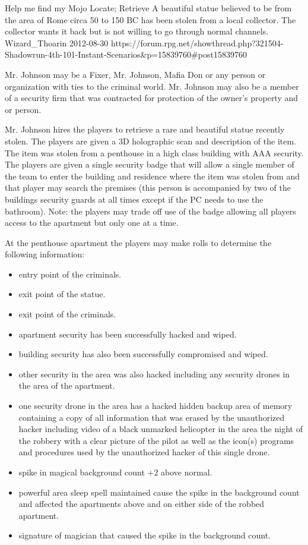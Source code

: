 \begin{scenario}{Help me find my Mojo}
	{Locate; Retrieve}
	{A beautiful statue believed to be from the area of Rome circa 50 to 150 BC has been stolen from a local collector. The collector wants it back but is not willing to go through normal channels.}
	{Wizard\_Thoarin}
	{2012-08-30}
	{https://forum.rpg.net/showthread.php?321504-Shadowrun-4th-101-Instant-Scenarios\&p=15839760#post15839760}

 Mr. Johnson may be a Fixer, Mr. Johnson, Mafia Don or any person or organization with ties to the criminal world. Mr. Johnson may also be a member of a security firm that was contracted for protection of the owner's property and or person.

\synopsis
 Mr. Johnson hires the players to retrieve a rare and beautiful statue recently stolen. The players are given a 3D holographic scan and description of the item. The item was stolen from a penthouse in a high class building with AAA security. The players are given a single security badge that will allow a single member of the team to enter the building and residence where the item was stolen from and that player may search the premises (this person is accompanied by two of the buildings security guards at all times except if the PC needs to use the bathroom). Note: the players may trade off use of the badge allowing all players access to the apartment but only one at a time.

At the penthouse apartment the players may make rolls to determine the following information:

\begin{itemize}
\item    entry point of the criminals.
\item    exit point of the statue.
\item    exit point of the criminals.
\item    apartment security has been successfully hacked and wiped.
\item    building security has also been successfully compromised and wiped.
\item    other security in the area was also hacked including any security drones in the area of the apartment.
\item    one security drone in the area has a hacked hidden backup area of memory containing a copy of all information that was erased by the unauthorized hacker including video of a black unmarked helicopter in the area the night of the robbery with a clear picture of the pilot as well as the icon(s) programs and procedures used by the unauthorized hacker of this single drone.
\item    spike in magical background count +2 above normal.
\item    powerful area sleep spell maintained cause the spike in the background count and affected the apartments above and on either side of the robbed apartment.
\item    signature of magician that caused the spike in the background count.
\end{itemize}



\end{scenario}
